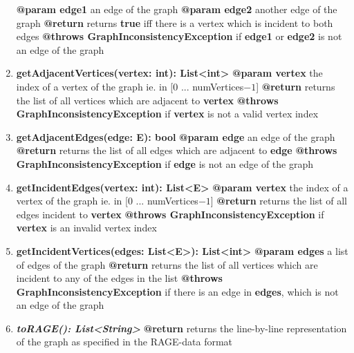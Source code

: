 \begin{enumerate}[+]
{			\textbf{@param edge1} an edge of the graph \newline
			\textbf{@param edge2} another edge of the graph \newline
			\textbf{@return} returns \textbf{true} iff there is a vertex which is incident to both edges \newline
			\textbf{@throws GraphInconsistencyException} if \textbf{edge1} or \textbf{edge2} is not an edge of the graph
		}
		\item{
			\textbf{getAdjacentVertices(vertex: int): List<int>} \newline
			\textbf{@param vertex} the index of a vertex of the graph ie. in [0 ... numVertices$-1$] \newline
			\textbf{@return} returns the list of all vertices which are adjacent to \textbf{vertex} \newline
			\textbf{@throws GraphInconsistencyException} if \textbf{vertex} is not a valid vertex index
		}
		\item{
			\textbf{getAdjacentEdges(edge: E): bool} \newline
			\textbf{@param edge} an edge of the graph \newline
			\textbf{@return} returns the list of all edges which are adjacent to \textbf{edge} \newline
			\textbf{@throws GraphInconsistencyException} if \textbf{edge} is not an edge of the graph
		}
		\item{
			\textbf{getIncidentEdges(vertex: int): List<E>} \newline
			\textbf{@param vertex} the index of a vertex of the graph ie. in [0 ... numVertices$-1$] \newline
			\textbf{@return} returns the list of all edges incident to \textbf{vertex} \newline
			\textbf{@throws GraphInconsistencyException} if \textbf{vertex} is an invalid vertex index
		}
		\item{
			\textbf{getIncidentVertices(edges: List<E>): List<int>} \newline
			\textbf{@param edges} a list of edges of the graph \newline
			\textbf{@return} returns the list of all vertices which are incident to any of the edges in the list \newline
			\textbf{@throws GraphInconsistencyException} if there is an edge in \textbf{edges}, which is not an edge of the graph
			
		}
		\item{
			\textbf{\textit{toRAGE(): List<String>}} \newline
			\textbf{@return} returns the line-by-line representation of the graph as specified in the RAGE-data format
		}
	\end{enumerate}
	
